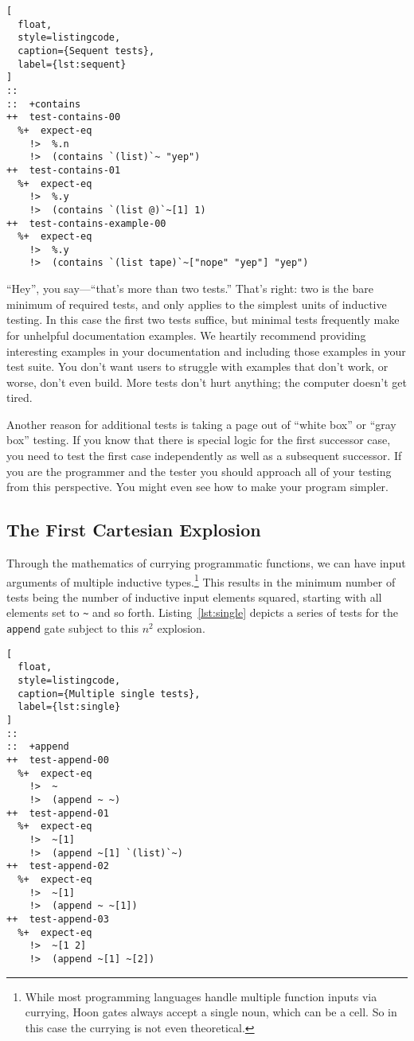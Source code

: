 \documentclass[twoside]{article}
\begin{document}
\begin{lstlisting}[
  float,
  style=listingcode,
  caption={Sequent tests},
  label={lst:sequent}
]
::
::  +contains
++  test-contains-00
  %+  expect-eq
    !>  %.n
    !>  (contains `(list)`~ "yep")
++  test-contains-01
  %+  expect-eq
    !>  %.y
    !>  (contains `(list @)`~[1] 1) 
++  test-contains-example-00
  %+  expect-eq
    !>  %.y
    !>  (contains `(list tape)`~["nope" "yep"] "yep")
\end{lstlisting}

``Hey'', you say—``that's more than two tests.''  That's right:  two is the bare minimum of required tests, and only applies to the simplest units of inductive testing. In this case the first two tests suffice, but minimal tests frequently make for unhelpful documentation examples. We heartily recommend providing interesting examples in your documentation and including those examples in your test suite. You don't want users to struggle with examples that don't work, or worse, don't even build. More tests don't hurt anything; the computer doesn't get tired.

Another reason for additional tests is taking a page out of ``white box'' or ``gray box'' testing. If you know that there is special logic for the first successor case, you need to test the first case independently as well as a subsequent successor. If you are the programmer and the tester you should approach all of your testing from this perspective. You might even see how to make your program simpler.

\subsection{The First Cartesian Explosion}

Through the mathematics of currying programmatic functions, we can have input arguments of multiple inductive types.\footnote{While most programming languages handle multiple function inputs via currying, Hoon gates always accept a single noun, which can be a cell.  So in this case the currying is not even theoretical.}  This results in the minimum number of tests being the number of inductive input elements squared, starting with all elements set to \lstinline[style=inlinecode]{~} and so forth.  Listing~\ref{lst:single} depicts a series of tests for the \texttt{append} gate subject to this $n^2$ explosion.

\begin{lstlisting}[
  float,
  style=listingcode,
  caption={Multiple single tests},
  label={lst:single}
]
::
::  +append
++  test-append-00
  %+  expect-eq
    !>  ~
    !>  (append ~ ~)
++  test-append-01
  %+  expect-eq
    !>  ~[1]
    !>  (append ~[1] `(list)`~)
++  test-append-02
  %+  expect-eq
    !>  ~[1]
    !>  (append ~ ~[1])
++  test-append-03
  %+  expect-eq
    !>  ~[1 2]
    !>  (append ~[1] ~[2])
\end{lstlisting}
\end{document}
